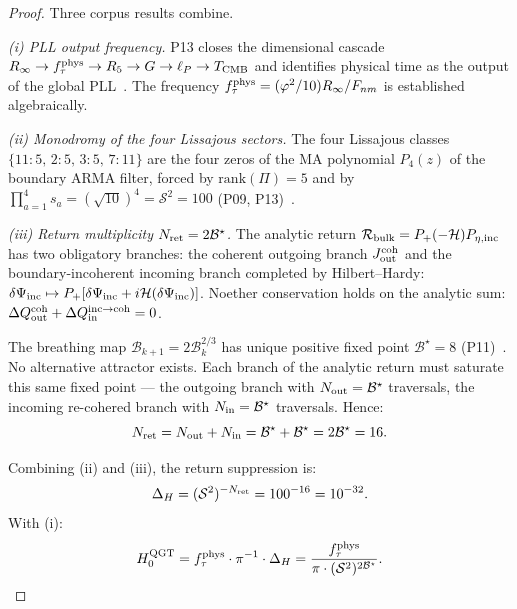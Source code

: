 \documentclass[twocolumn,10pt]{article}
\newcommand{\vp}{\varphi}
\begin{document}
\begin{proof}
Three corpus results combine.

\emph{(i) PLL output frequency.}
P13 closes the dimensional cascade
$R_\infty\to f_\tau^{\rm phys}\to R_5\to G\to\ell_P\to T_{\rm CMB}$
and identifies physical time as the output of the global PLL~\cite{CamP13}.
The frequency $f_\tau^{\rm phys}=(\vp^2/10)R_\infty/F_{nm}$
is established algebraically.

\emph{(ii) Monodromy of the four Lissajous sectors.}
The four Lissajous classes $\{11{:}5,\,2{:}5,\,3{:}5,\,7{:}11\}$
are the four zeros of the MA polynomial $P_4(z)$ of the boundary
ARMA filter, forced by $\mathrm{rank}(\Pi)=5$ and by
$\prod_{a=1}^{4}s_a=(\sqrt{10})^4=\mathcal{S}^2=100$
(P09, P13)~\cite{CamP09,CamP13}.

\emph{(iii) Return multiplicity $N_{\rm ret}=2\mathcal{B}^\star$.}
The analytic return $\mathcal{R}_{\rm bulk}=P_+(-\mathcal{H})P_{\eta,\rm inc}$
has two obligatory branches: the coherent outgoing branch
$J_{\rm out}^{\rm coh}$ and the boundary-incoherent incoming branch
completed by Hilbert--Hardy:
$\delta\Psi_{\rm inc}\mapsto P_+[\delta\Psi_{\rm inc}+i\mathcal{H}(\delta\Psi_{\rm inc})]$.
Noether conservation holds on the analytic sum:
$\Delta Q_{\rm out}^{\rm coh}+\Delta Q_{\rm in}^{\rm inc\to coh}=0$.

The breathing map $\mathcal{B}_{k+1}=2\mathcal{B}_k^{2/3}$ has unique positive
fixed point $\mathcal{B}^\star=8$ (P11)~\cite{CamP11}.
No alternative attractor exists.
Each branch of the analytic return must saturate this same fixed
point — the outgoing branch with $N_{\rm out}=\mathcal{B}^\star$ traversals,
the incoming re-cohered branch with $N_{\rm in}=\mathcal{B}^\star$ traversals.
Hence:
\begin{equation*}
  N_{\rm ret} = N_{\rm out}+N_{\rm in} = \mathcal{B}^\star+\mathcal{B}^\star = 2\mathcal{B}^\star = 16.
\end{equation*}

Combining (ii) and (iii), the return suppression is:
\begin{equation*}
  \Delta_H = (\mathcal{S}^2)^{-N_{\rm ret}}
           = 100^{-16} = 10^{-32}.
\end{equation*}
With (i):
\begin{equation*}
  H_0^{\rm QGT}
  = f_\tau^{\rm phys}\cdot\pi^{-1}\cdot\Delta_H
  = \frac{f_\tau^{\rm phys}}{\pi\cdot(\mathcal{S}^2)^{2\mathcal{B}^\star}}.
\end{equation*}
\end{proof}
\end{document}
